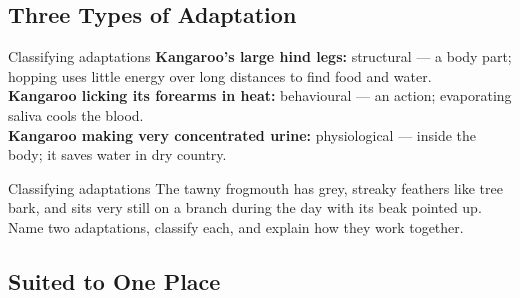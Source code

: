 \label{theory:8}

\subsection{Three Types of Adaptation}\label{sub:8.1}

\begin{center}
\end{center}

\begin{workedex}{Classifying adaptations}
\textbf{Kangaroo's large hind legs:} structural --- a body part; hopping uses little energy over long distances to find food and water.\\
\textbf{Kangaroo licking its forearms in heat:} behavioural --- an action; evaporating saliva cools the blood.\\
\textbf{Kangaroo making very concentrated urine:} physiological --- inside the body; it saves water in dry country.
\end{workedex}

\begin{wedo}{Classifying adaptations}
The tawny frogmouth has grey, streaky feathers like tree bark, and sits very still on a branch during the day with its beak pointed up. Name two adaptations, classify each, and explain how they work together.
\answerbox{5cm}
\end{wedo}

\subsection{Suited to One Place}\label{sub:8.2}

